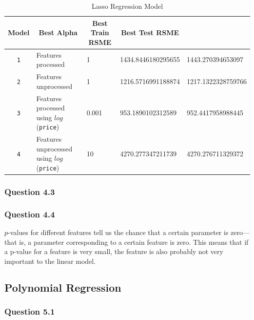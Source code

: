 \documentclass[11pt,letterpaper]{article}
\begin{document}
\begin{table}[H]
    \centering
    \begin{tabular}{cllll}
        \hline
    Model & \multicolumn{1}{c}{Best Alpha} & \multicolumn{1}{c}{Best Train RSME} & \multicolumn{1}{c}{Best Test RSME} \\
    \hline
    \texttt{1}     & Features processed       & 1       & 1434.8446180295655                                                     & 1443.270394653097                                                      \\
    \texttt{2}     & Features unprocessed    & 1        & 1216.5716991188874                                                      & 1217.1322328759766
    \\
    \texttt{3}     & Features processed using $log$(\texttt{price})  & 0.001 & 953.1890102312589                                                     & 952.4417958988445                                                       \\
    \texttt{4}     & Features unprocessed using $log$(\texttt{price}) & 10 &  4270.277347211739                                                   & 4270.276711329372                                                   
    \end{tabular}
    \caption{Lasso Regression Model}
\end{table}









\subsubsection*{Question 4.3}

\subsubsection*{Question 4.4}
$p$-values for different features tell us the chance that a certain parameter is zero—
that is, a parameter corresponding to a certain feature is zero. This means that if a
p-value for a feature is very small, the feature is also probably not very important to
the linear model. 


\subsection*{Polynomial Regression}

\subsubsection*{Question 5.1}
\end{document}
